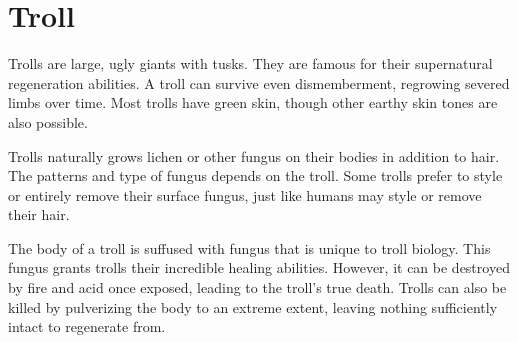 


\section{Troll}
  Trolls are large, ugly giants with tusks.
  They are famous for their supernatural regeneration abilities.
  A troll can survive even dismemberment, regrowing severed limbs over time.
  Most trolls have green skin, though other earthy skin tones are also possible.

  Trolls naturally grows lichen or other fungus on their bodies in addition to hair.
  The patterns and type of fungus depends on the troll.
  Some trolls prefer to style or entirely remove their surface fungus, just like humans may style or remove their hair.

  The body of a troll is suffused with fungus that is unique to troll biology.
  This fungus grants trolls their incredible healing abilities.
  However, it can be destroyed by fire and acid once exposed, leading to the troll's true death.
  Trolls can also be killed by pulverizing the body to an extreme extent, leaving nothing sufficiently intact to regenerate from.

